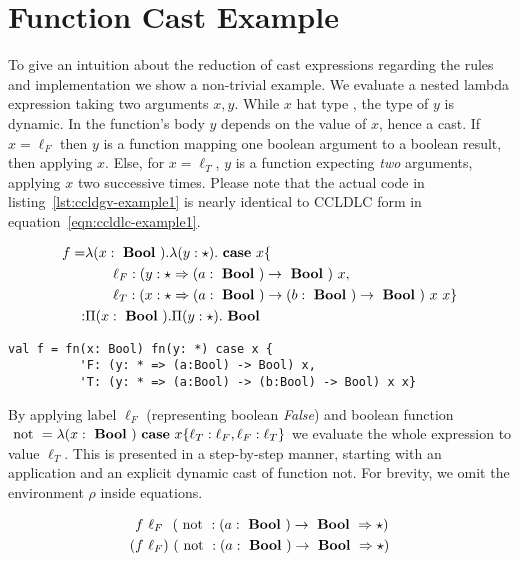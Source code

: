 \section{Function Cast Example}

To give an intuition about the reduction of cast expressions regarding the rules and implementation we show a non-trivial example. We evaluate a nested lambda expression taking two arguments $x,y$. While $x$ hat type \Bool, the type of $y$ is dynamic. In the function's body $y$ depends on the value of $x$, hence a cast. If $x=\ell_F$ then $y$ is a function mapping one boolean argument to a boolean result, then applying $x$. Else, for $x=\ell_T$, $y$ is a function expecting \emph{two} arguments, applying $x$ two successive times. Please note that the actual code in listing~\ref{lst:ccldgv-example1} is nearly identical to CCLDLC form in equation~\ref{eqn:ccldlc-example1}.

\begin{equation}\label{eqn:ccldlc-example1}
\begin{split}
f = & \lambda (x: \text{ \textbf{Bool} })
. \lambda (y: \star )
. \text{ \textbf{case} } x \{ \\
& \qquad \ell_F: (y : \star \Rightarrow (a:\text{ \textbf{Bool} }) \rightarrow \text{ \textbf{Bool} })~x, \\
& \qquad \ell_T: (x : \star \Rightarrow (a:\text{ \textbf{Bool} }) \rightarrow (b:\text{ \textbf{Bool} }) \rightarrow \text{ \textbf{Bool} })~x~x \} \\
: & \Pi(x : \text{ \textbf{Bool} }) . \Pi (y: \star ) . \text{ \textbf{Bool} }
\end{split}
\end{equation}

\begin{lstlisting}[language=ldgv,
  label=lst:ccldgv-example1,
  caption=CCLDGV example ``dependent function cast'']
val f = fn(x: Bool) fn(y: *) case x {
          'F: (y: * => (a:Bool) -> Bool) x,
          'T: (y: * => (a:Bool) -> (b:Bool) -> Bool) x x}
\end{lstlisting}

By applying label $\ell_F$ (representing boolean \emph{False}) and boolean function $\text{ not } = \lambda (x:\text{ \textbf{Bool} }) \text{ \textbf{case} } x \{ \ell_T: \ell_F, \ell_F: \ell_T\}$ we evaluate the whole expression to value $\ell_T$. This is presented in a step-by-step manner, starting with an application and an explicit dynamic cast of function not. For brevity, we omit the environment $\rho$ inside equations.

\begin{align}
& f~\ell_F~~(\text{ not } : (a:\text{ \textbf{Bool} }) \rightarrow \text{ \textbf{Bool} } \Rightarrow \star) \\
( & f~\ell_F)~(\text{ not } : (a:\text{ \textbf{Bool} }) \rightarrow \text{ \textbf{Bool} } \Rightarrow \star)
\end{align}

